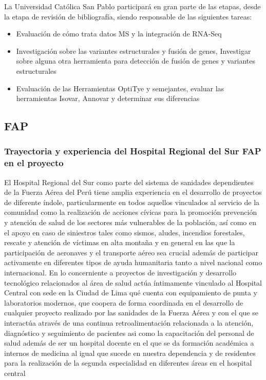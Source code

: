 \documentclass[a4paper,11pt]{article}
\begin{document}
La Universidad Católica San Pablo participará en gran parte de las etapas, desde la etapa de revisión de bibliografía, siendo responsable de las siguientes tareas: 
\begin{itemize}
	

\item Evaluación de cómo trata datos MS y la integración de RNA-Seq
\item Investigación sobre las variantes estructurales y fusión de genes, Investigar sobre alguna otra herramienta para detección de fusión de genes y variantes estructurales
\item Evaluación de las Herramientas OptiTye y semejantes, evaluar las herramientas Isovar, Annovar y determinar sus diferencias
\end{itemize}

\subsection{FAP}

\subsubsection{Trayectoria y experiencia del Hospital Regional del Sur FAP en el proyecto}
El Hospital Regional del Sur como parte del sistema de sanidades dependientes de la Fuerza Aérea del Perú tiene amplia experiencia en el desarrollo de proyectos de diferente índole, particularmente en todos aquellos vinculados al servicio de la comunidad como la realización de acciones cívicas para la promoción prevención y atención de salud de los sectores más vulnerables de la población, así como en el apoyo en caso de siniestros tales como sismos, aludes, incendios forestales, rescate y atención de víctimas en alta montaña y en general en las que la participación de aeronaves y el transporte aéreo sea crucial además de participar activamente en diferentes tipos de ayuda humanitaria tanto a nivel nacional como internacional.
En lo concerniente a proyectos de investigación y desarrollo tecnológico relacionados al área de salud actúa íntimamente vinculado al Hospital Central con sede en la Ciudad de Lima qué cuenta con equipamiento de punta y laboratorios modernos, que coopera de forma  coordinada en el desarrollo de cualquier proyecto realizado por las sanidades de la Fuerza Aérea y con el que se interactúa através de  una continua retroalimentación relacionada a la atención, diagnóstico y seguimiento de pacientes asi como la capacitación del personal de salud además de ser un hospital docente en el que se da formación académica a internos de medicina al igual que sucede en nuestra dependencia y de residentes para la realización de la segunda especialidad en diferentes áreas en el hospital central
\end{document}
